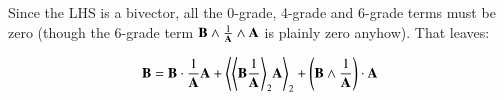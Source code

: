 \documentclass{article}      %
\newcommand{\gpgrade}[2] {{\left\langle{{#1}}\right\rangle}_{#2}}
\begin{document}
Since the LHS is a bivector, all the 0-grade, 4-grade and 6-grade terms must be zero (though the 6-grade term $\mathbf{B} \wedge \frac{1}{\mathbf{A}} \wedge \mathbf{A}$ is plainly zero anyhow).  That leaves:

\begin{equation}\label{eqn:bivectorprojbivector}
\BB
= 
\BB \cdot \inv{\BA} \BA \\
+\gpgrade{\gpgrade{\BB\inv\BA}{2} \BA}{2}
+\left(\BB \wedge \inv{\BA}\right) \cdot \BA 
\end{equation}
\newcommand{\grade}[2] {{\left\langle{{#1}}\right\rangle}_{#2}}

%
%
\end{document}
